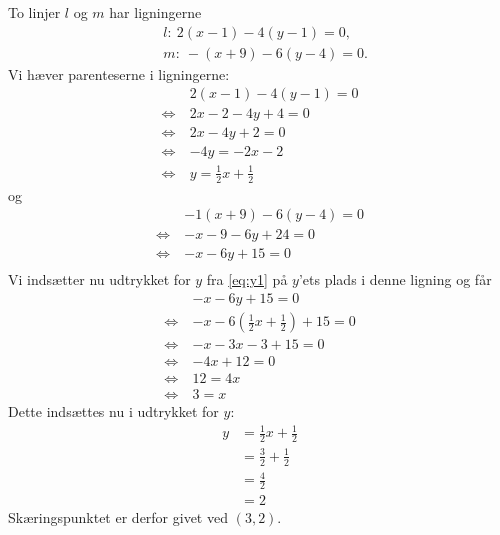 \begin{exa}
	To linjer $l$ og $m$ har ligningerne 
	\begin{align*}
		&l: \ 2(x-1)-4(y-1) = 0,\\
		&m: \ -(x+9)-6(y-4) = 0.
	\end{align*}
	Vi hæver parenteserne i ligningerne:
	\begin{align}\label{eq:y1}
		&2(x-1) - 4(y-1) = 0 \nonumber \\
		\Leftrightarrow \ &2x-2-4y+4 = 0 \nonumber \\
		\Leftrightarrow \ &2x-4y+2=0 \nonumber \\
		\Leftrightarrow	\ &-4y = -2x-2 \nonumber \\
		\Leftrightarrow \ &y =\frac{1}{2}x + \frac{1}{2}
	\end{align}
	og
	\begin{align*}
		&-1(x+9)-6(y-4) = 0\\
		\Leftrightarrow \ &-x-9-6y+24=0\\
		\Leftrightarrow \ &-x-6y+15=0\\
	\end{align*}
	Vi indsætter nu udtrykket for $y$ fra \eqref{eq:y1} på $y$'ets plads i denne ligning og får
	\begin{align*}
		 & -x -6y+15=0\\
		 \Leftrightarrow	\ &-x -6\left(\frac{1}{2}x + \frac{1}{2}\right)+ 15 = 0\\
		 \Leftrightarrow	\ &-x-3x-3+15 = 0\\
		 \Leftrightarrow \ &-4x + 12 = 0\\
		 \Leftrightarrow \ &12 = 4x \\
		 \Leftrightarrow \ &3 = x
	\end{align*}
	Dette indsættes nu i udtrykket for $y$:
	\begin{align*}
		y &= \frac{1}{2}x + \frac{1}{2} \\
		 &=\frac{3}{2} + \frac{1}{2}\\
		&=\frac{4}{2}\\
		&= 2
	\end{align*}
	Skæringspunktet er derfor givet ved $(3,2)$.
\end{exa}

